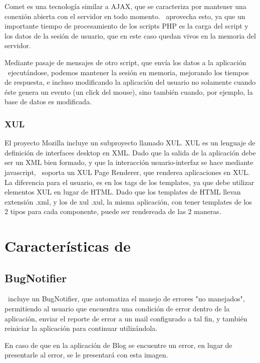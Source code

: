 Comet es una tecnología similar a AJAX, que se caracteriza por mantener una conexión abierta con el servidor en todo momento. \PWB \ aprovecha esto, ya que un importante tiempo de procesamiento de los scripts PHP es la carga del script y los datos de la sesión de usuario, que en este caso quedan vivos en la memoria del servidor.

Mediante pasaje de mensajes de otro script, que envía los datos a la aplicación \PWB \ ejecutándose, podemos mantener la sesión en memoria, mejorando los tiempos de respuesta, e incluso modificando la aplicación del usuario no solamente cuando éste genera un evento (un click del mouse), sino también cuando, por ejemplo, la base de datos es modificada.

\subsubsection{XUL}

El proyecto Mozilla incluye un subproyecto llamado XUL. XUL es un lenguaje de definición de interfaces desktop en XML. Dado que la salida de la aplicación debe ser un XML bien formado, y que la interacción usuario-interfaz se hace mediante javascript, \PWB \ soporta un XUL Page Renderer, que renderea aplicaciones en XUL. La diferencia para el usuario, es en los tags de los templates, ya que debe utilizar elementos XUL en lugar de HTML. Dado que los templates de HTML llevan extensión .xml, y los de xul .xul, la misma aplicación, con tener templates de los 2 tipos para cada componente, puede ser rendereada de las 2 maneras.

\section{Características de \PITS}

\subsection{BugNotifier}

\PWB \ incluye un BugNotifier, que automatiza el manejo de errores "no manejados", permitiendo al usuario que encuentra una condición de error dentro de la aplicación, enviar el reporte de error a un mail configurado a tal fin, y también reiniciar la aplicación para continuar utilizándola.

En caso de que en la aplicación de Blog se encuentre un error, en lugar de presentarle al error, se le presentará con esta imagen.

